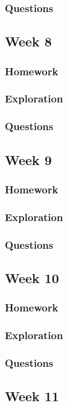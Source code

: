 \documentclass{article}
\theoremstyle{theorem}
\theoremstyle{definition}
\theoremstyle{remark}
\begin{document}
\subsubsection{Questions}

\subsection{Week 8}
\subsubsection{Homework}
\subsubsection{Exploration}
\subsubsection{Questions}

\subsection{Week 9}
\subsubsection{Homework}
\subsubsection{Exploration}
\subsubsection{Questions}

\subsection{Week 10}
\subsubsection{Homework}
\subsubsection{Exploration}
\subsubsection{Questions}

\subsection{Week 11}
\end{document}
